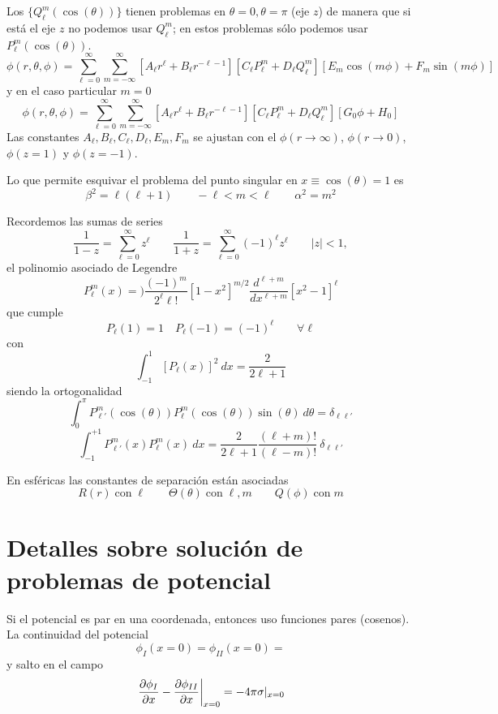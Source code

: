 \documentclass[10pt,oneside]{CBFT_book}
\begin{document}
Los $\{ Q_\ell^m(\cos(\theta))\}$ tienen problemas en $\theta=0,\theta=\pi$ (eje $z$) de manera que si está el
eje $z$ no podemos usar $Q_\ell^m$; en estos problemas sólo podemos usar $P_\ell^m(\cos(\theta))$.
\[
	\phi(r,\theta,\phi) = \sum_{\ell=0}^{\infty}\sum_{m=-\infty}^{\infty} \left[ A_\ell r^\ell + 
	B_\ell r^{-\ell-1} \right] \left[ C_\ell P_\ell^m + D_\ell Q_\ell^m \right] \left[ E_m \cos(m\phi) + 
	F_m \sin(m\phi) \right]
\]
y en el caso particular $m=0$
\[
	\phi(r,\theta,\phi) = \sum_{\ell=0}^{\infty}\sum_{m=-\infty}^{\infty} \left[ A_\ell r^\ell + 
	B_\ell r^{-\ell-1} \right] \left[ C_\ell P_\ell^m + D_\ell Q_\ell^m \right] \left[ G_0 \phi + 
	H_0 \right]	
\]
Las constantes $A_\ell, B_\ell, C_\ell, D_\ell, E_m, F_m$ se ajustan con el $\phi (r\to\infty)$, 
$\phi (r\to 0)$, $\phi (z = 1)$ y $\phi (z = -1)$.

Lo que permite esquivar el problema del punto singular en $x \equiv \cos(\theta)=1$ es
\[
	\beta^2 = \ell(\ell + 1) \qquad - \ell < m < \ell \qquad \alpha^2 = m^2
\]

Recordemos las sumas de series
\[
	\frac{1}{1-z} = \sum_{\ell=0}^{\infty} z^\ell \qquad \frac{1}{1+z} = \sum_{\ell=0}^{\infty} (-1)^\ell 
	z^\ell	\qquad |z|<1,
\]
el polinomio asociado de Legendre
\[
	P_\ell^m (x) =) \frac{(-1)^m}{2^\ell \ell!} [1-x^2]^{m/2} \frac{d^{\ell + m}}{dx^{\ell + m}} 
			[x^2 -1]^\ell
\]
que cumple
\[
	P_\ell (1) = 1 \quad P_\ell (-1) = (-1)^\ell \qquad  \forall \ell
\]
con 
\[
	\int_{-1}^1 [P_\ell (x)]^2 \: dx = \frac{2}{ 2\ell + 1 }
\]
siendo la ortogonalidad
\[
	\int_0^\pi P_{\ell'}^m (\cos(\theta)) P_\ell^m (\cos(\theta)) \sin(\theta) \: d\theta = 
	\delta_{\ell\ell'}
\]
\[
	\int_{-1}^{+1} P_{\ell'}^m (x) P_\ell^m (x) \: dx= \frac{2}{2\ell + 1}
	\frac{(\ell + m)!}{(\ell - m)!} \: \delta_{\ell\ell'}
\]

En esféricas las constantes de separación están asociadas
\[
	R(r) \; \mathrm{con} \; \ell \qquad \Theta(\theta) \; \mathrm{con} \; \ell,m \qquad
	Q(\phi) \; \mathrm{con} \; m
\]

\section{Detalles sobre solución de problemas de potencial}

Si el potencial es par en una coordenada, entonces uso funciones pares (cosenos). 
La continuidad del potencial
\[
	\phi_I(x=0) = \phi_{II}(x=0) = 
\]
y salto en el campo
\[
	\left.\frac{\partial^{\hspace{-0.05em}} {\phi_I}}{\partial {x}^{\hspace{-0.05em}}} - \frac{\partial^{\hspace{-0.05em}} {\phi_{II}}}{\partial {x}^{\hspace{-0.05em}}}\right|_{x=0} = -4\pi\sigma|_{x=0}
\]
\end{document}
